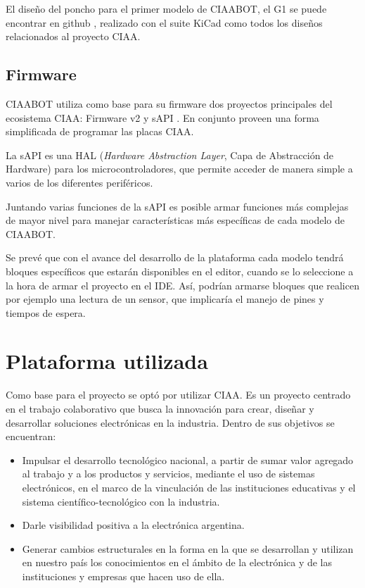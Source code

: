 El diseño del poncho para el primer modelo de CIAABOT, el G1 se puede encontrar en github \citep{CIAABOT:G1}, realizado con el suite KiCad como todos los diseños relacionados al proyecto CIAA.

\subsection{Firmware}
\label{subsec:firmware}
CIAABOT utiliza como base para su firmware dos proyectos principales del ecosistema CIAA: Firmware v2 \citep{CIAA:firmwarev2} y sAPI \citep{sAPI}. En conjunto proveen una forma simplificada de programar las placas CIAA.

La sAPI es una HAL (\emph{Hardware Abstraction Layer}, Capa de Abstracción de Hardware) para los microcontroladores, que permite acceder de manera simple a varios de los diferentes periféricos.

Juntando varias funciones de la sAPI es posible armar funciones más complejas de mayor nivel para manejar características más específicas de cada modelo de CIAABOT.

Se prevé que con el avance del desarrollo de la plataforma cada modelo tendrá bloques específicos que estarán disponibles en el editor, cuando se lo seleccione a la hora de armar el proyecto en el IDE. Así, podrían armarse bloques que realicen por ejemplo una lectura de un sensor, que implicaría el manejo de pines y tiempos de espera.

\section{Plataforma utilizada}
\label{sec:plataforma}
Como base para el proyecto se optó por utilizar CIAA. Es un proyecto centrado en el trabajo colaborativo que busca la innovación para crear, diseñar y desarrollar soluciones electrónicas en la industria. Dentro de sus objetivos se encuentran:

\begin{itemize}
\item Impulsar el desarrollo tecnológico nacional, a partir de sumar valor agregado al trabajo y a los productos y servicios, mediante el uso de sistemas electrónicos, en el marco de la vinculación de las instituciones educativas y el sistema científico-tecnológico con la industria.

\item Darle visibilidad positiva a la electrónica argentina.

\item Generar cambios estructurales en la forma en la que se desarrollan y utilizan en nuestro país los conocimientos en el ámbito de la electrónica y de las instituciones y empresas que hacen uso de ella. \citep{CIAA:wiki}
\end{itemize}

